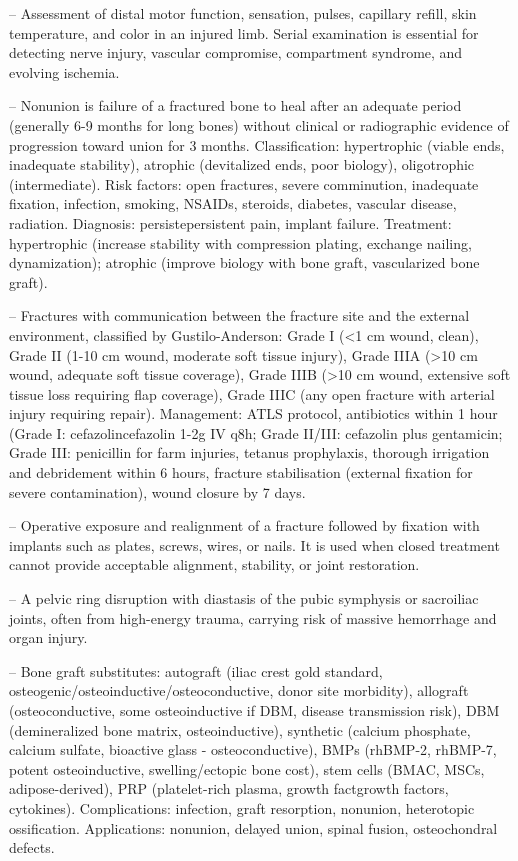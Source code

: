 -- Assessment of distal motor function, sensation, pulses, capillary refill, skin temperature, and color in an injured limb. Serial examination is essential for detecting nerve injury, vascular compromise, compartment syndrome, and evolving ischemia.

-- Nonunion is failure of a fractured bone to heal after an adequate period (generally 6-9 months for long bones) without clinical or radiographic evidence of progression toward union for 3 months. Classification: hypertrophic (viable ends, inadequate stability), atrophic (devitalized ends, poor biology), oligotrophic (intermediate). Risk factors: open fractures, severe comminution, inadequate fixation, infection, smoking, NSAIDs, steroids, diabetes, vascular disease, radiation. Diagnosis: persistepersistent pain, implant failure. Treatment: hypertrophic (increase stability with compression plating, exchange nailing, dynamization); atrophic (improve biology with bone graft, vascularized bone graft).

-- Fractures with communication between the fracture site and the external environment, classified by Gustilo-Anderson: Grade I (<1 cm wound, clean), Grade II (1-10 cm wound, moderate soft tissue injury), Grade IIIA (>10 cm wound, adequate soft tissue coverage), Grade IIIB (>10 cm wound, extensive soft tissue loss requiring flap coverage), Grade IIIC (any open fracture with arterial injury requiring repair). Management: ATLS protocol, antibiotics within 1 hour (Grade I: cefazolincefazolin 1-2g IV q8h; Grade II/III: cefazolin plus gentamicin; Grade III: penicillin for farm injuries, tetanus prophylaxis, thorough irrigation and debridement within 6 hours, fracture stabilisation (external fixation for severe contamination), wound closure by 7 days.

-- Operative exposure and realignment of a fracture followed by fixation with implants such as plates, screws, wires, or nails. It is used when closed treatment cannot provide acceptable alignment, stability, or joint restoration.

-- A pelvic ring disruption with diastasis of the pubic symphysis or sacroiliac joints, often from high-energy trauma, carrying risk of massive hemorrhage and organ injury.

-- Bone graft substitutes: autograft (iliac crest gold standard, osteogenic/osteoinductive/osteoconductive, donor site morbidity), allograft (osteoconductive, some osteoinductive if DBM, disease transmission risk), DBM (demineralized bone matrix, osteoinductive), synthetic (calcium phosphate, calcium sulfate, bioactive glass - osteoconductive), BMPs (rhBMP-2, rhBMP-7, potent osteoinductive, swelling/ectopic bone cost), stem cells (BMAC, MSCs, adipose-derived), PRP (platelet-rich plasma, growth factgrowth factors, cytokines). Complications: infection, graft resorption, nonunion, heterotopic ossification. Applications: nonunion, delayed union, spinal fusion, osteochondral defects.

